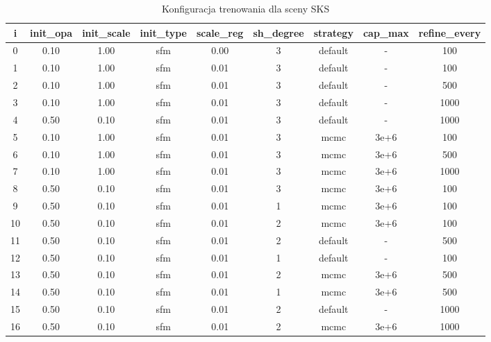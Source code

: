 \begin{table}[!h]
    \centering
    \begin{tabular}{|c|c|c|c|c|c|c|c|c|}
    \hline
    i & init\_opa & init\_scale & init\_type & scale\_reg & sh\_degree & strategy & cap\_max & refine\_every \\
    \hline
    0 & 0.10 & 1.00 & sfm & 0.00 & 3  & default & - & 100 \\
    \hline
    1 & 0.10 & 1.00 & sfm & 0.01 & 3 & default & - & 100 \\
    \hline
    2 & 0.10 & 1.00 & sfm & 0.01 & 3 & default & - & 500 \\
    \hline
    3 & 0.10 & 1.00 & sfm & 0.01 & 3 & default & - & 1000 \\
    \hline
    4 & 0.50 & 0.10 & sfm & 0.01 & 3 & default & - & 1000 \\
    \hline
    5 & 0.10 & 1.00 & sfm & 0.01 & 3 & mcmc & 3e+6 & 100 \\
    \hline
    6 & 0.10 & 1.00 & sfm & 0.01 & 3 & mcmc & 3e+6 & 500 \\
    \hline
    7 & 0.10 & 1.00 & sfm & 0.01 & 3 & mcmc & 3e+6 & 1000 \\
    \hline
    8 & 0.50 & 0.10 & sfm & 0.01 & 3 & mcmc & 3e+6 & 100 \\
    \hline
    9 & 0.50 & 0.10 & sfm & 0.01 & 1 & mcmc & 3e+6 & 100 \\
    \hline
    10 & 0.50 & 0.10 & sfm & 0.01 & 2 & mcmc & 3e+6 & 100 \\
    \hline
    11 & 0.50 & 0.10 & sfm & 0.01 & 2 & default & - & 500 \\
    \hline
    12 & 0.50 & 0.10 & sfm & 0.01 & 1 & default & - & 100 \\
    \hline
    13 & 0.50 & 0.10 & sfm & 0.01 & 2 & mcmc & 3e+6 & 500 \\
    \hline
    14 & 0.50 & 0.10 & sfm & 0.01 & 1 & mcmc & 3e+6 & 500 \\
    \hline
    15 & 0.50 & 0.10 & sfm & 0.01 & 2 & default & - & 1000 \\  
    \hline
    16 & 0.50 & 0.10 & sfm & 0.01 & 2 & mcmc & 3e+6 & 1000 \\
    \hline
    \end{tabular}
    \caption{Konfiguracja trenowania dla sceny SKS}
    \label{table:tab_conf_sks}
\end{table}


